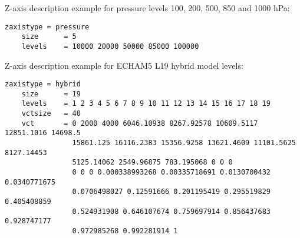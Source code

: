 Z-axis description example for pressure levels 100, 200, 500, 850 and 1000 hPa:
\begin{lstlisting}[frame=single, backgroundcolor=\color{zebg}, basicstyle=\footnotesize]
    zaxistype = pressure
    size      = 5
    levels    = 10000 20000 50000 85000 100000
\end{lstlisting}

Z-axis description example for ECHAM5 L19 hybrid model levels:
\begin{lstlisting}[frame=single, backgroundcolor=\color{zebg}, basicstyle=\footnotesize]
    zaxistype = hybrid
    size      = 19
    levels    = 1 2 3 4 5 6 7 8 9 10 11 12 13 14 15 16 17 18 19
    vctsize   = 40
    vct       = 0 2000 4000 6046.10938 8267.92578 10609.5117 12851.1016 14698.5
                15861.125 16116.2383 15356.9258 13621.4609 11101.5625 8127.14453
                5125.14062 2549.96875 783.195068 0 0 0 
                0 0 0 0.000338993268 0.00335718691 0.0130700432 0.0340771675 
                0.0706498027 0.12591666 0.201195419 0.295519829 0.405408859 
                0.524931908 0.646107674 0.759697914 0.856437683 0.928747177 
                0.972985268 0.992281914 1
\end{lstlisting}

\vspace{2mm}
